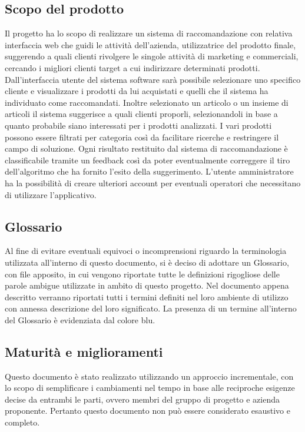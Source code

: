 \subsection{Scopo del prodotto}
Il progetto ha lo scopo di realizzare un sistema di raccomandazione con relativa interfaccia web
che guidi le attività dell’azienda, utilizzatrice del prodotto finale, suggerendo a quali clienti
rivolgere le singole attività di marketing e commerciali, cercando i migliori clienti target a cui
indirizzare determinati prodotti.
Dall’interfaccia utente del sistema software sarà possibile selezionare uno specifico cliente e visualizzare i prodotti da lui acquistati e quelli che il sistema ha individuato come raccomandati.
Inoltre selezionato un articolo o un insieme di articoli il sistema suggerisce a quali clienti proporli, selezionandoli in base a quanto probabile siano interessati per i prodotti analizzati. I vari
prodotti possono essere filtrati per categoria così da facilitare ricerche e restringere il campo di
soluzione.
Ogni risultato restituito dal sistema di raccomandazione è classificabile tramite un feedback
così da poter eventualmente correggere il tiro dell’algoritmo che ha fornito l’esito della suggerimento.
L’utente amministratore ha la possibilità di creare ulteriori account per eventuali operatori che
necessitano di utilizzare l’applicativo.

\subsection{Glossario}
Al fine di evitare eventuali equivoci o incomprensioni riguardo la terminologia utilizzata all’interno di questo documento, si è deciso di adottare un Glossario, con file apposito, in cui
vengono riportate tutte le definizioni rigogliose delle parole ambigue utilizzate in ambito di
questo progetto. Nel documento appena descritto verranno riportati tutti i termini definiti nel
loro ambiente di utilizzo con annessa descrizione del loro significato.
La presenza di un termine all’interno del Glossario è evidenziata dal colore blu.

\subsection{Maturità e miglioramenti}
Questo documento è stato realizzato utilizzando un approccio incrementale, con lo scopo di
semplificare i cambiamenti nel tempo in base alle reciproche esigenze decise da entrambi le
parti, ovvero membri del gruppo di progetto e azienda proponente. Pertanto questo documento
non può essere considerato esaustivo e completo.

